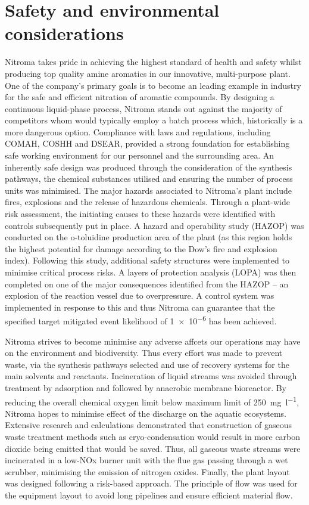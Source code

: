 \section*{Safety and environmental considerations}

Nitroma takes pride in achieving the highest standard of health and safety whilst producing top quality amine aromatics in our innovative, multi-purpose plant. One of the company's primary goals is to become an leading example in industry for the safe and efficient nitration of aromatic compounds. By designing a continuous liquid-phase process, Nitroma stands out against the majority of competitors whom would typically employ a batch process which, historically is a more dangerous option. Compliance with laws and regulations, including COMAH, COSHH and DSEAR, provided a strong foundation for establishing safe working environment for our personnel and the surrounding area. An inherently safe design was produced through the consideration of the synthesis pathways, the chemical substances utilised and ensuring the number of process units was minimised. The major hazards associated to Nitroma's plant include fires, explosions and the release of hazardous chemicals. Through a plant-wide risk assessment, the initiating causes to these hazards were identified with controls subsequently put in place. A hazard and operability study (HAZOP) was conducted on the o-toluidine production area of the plant (as this region holds the highest potential for damage according to the Dow's fire and explosion index). Following this study, additional safety structures were implemented to minimise critical process risks. A layers of protection analysis (LOPA) was then completed on one of the major consequences identified from the HAZOP – an explosion of the reaction vessel due to overpressure. A control system was implemented in response to this and thus Nitroma can guarantee that the specified target mitigated event likelihood of \num{1e-6} has been achieved.

Nitroma strives to become minimise any adverse affcets our operations may have on the environment and biodiversity. Thus every effort was made to prevent waste, via the synthesis pathways selected and use of recovery systems for the main solvents and reactants. Incineration of liquid streams was avoided through treatment by adsorption and followed by anaerobic membrane bioreactor. By reducing the overall chemical oxygen limit below maximum limit of \SI{250}{\mg\per\litre}, Nitroma hopes to minimise effect of the discharge on the  aquatic ecosystems. Extensive research and calculations demonstrated that construction of gaseous waste treatment methods such as cryo-condensation would result in more carbon dioxide being emitted that would be saved. Thus, 
all gaseous waste streams were incinerated in a low-NOx burner unit with the flue gas passing through a wet scrubber, minimising the emission of nitrogen oxides. Finally, the plant layout was designed following a risk-based approach. The principle of flow was used for the equipment layout to avoid long pipelines and ensure efficient material flow. 




